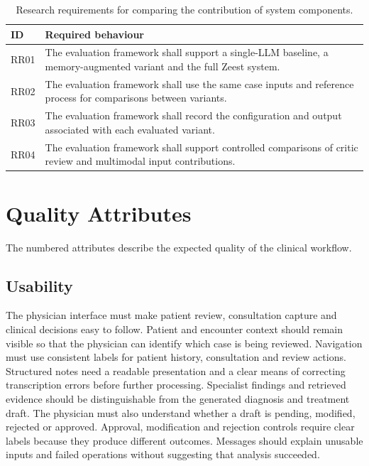 \begin{table}[htbp]
\centering
\small
\caption{Research requirements for comparing the contribution of system components.}
\label{tab:kashaf:research-requirements}
\begin{tabular}{|p{}|p{}|}
\hline
ID & Required behaviour \\ \hline
RR01 & The evaluation framework shall support a single-LLM baseline, a memory-augmented variant and the full Zeest system. \\ \hline
RR02 & The evaluation framework shall use the same case inputs and reference process for comparisons between variants. \\ \hline
RR03 & The evaluation framework shall record the configuration and output associated with each evaluated variant. \\ \hline
RR04 & The evaluation framework shall support controlled comparisons of critic review and multimodal input contributions. \\ \hline
\end{tabular}
\end{table}

\clearpage
\section{Quality Attributes}
The numbered attributes describe the expected quality of the clinical workflow.

\subsection{Usability}
The physician interface must make patient review, consultation capture and clinical decisions easy to follow. Patient and encounter context should remain visible so that the physician can identify which case is being reviewed. Navigation must use consistent labels for patient history, consultation and review actions. Structured notes need a readable presentation and a clear means of correcting transcription errors before further processing. Specialist findings and retrieved evidence should be distinguishable from the generated diagnosis and treatment draft. The physician must also understand whether a draft is pending, modified, rejected or approved. Approval, modification and rejection controls require clear labels because they produce different outcomes. Messages should explain unusable inputs and failed operations without suggesting that analysis succeeded.


